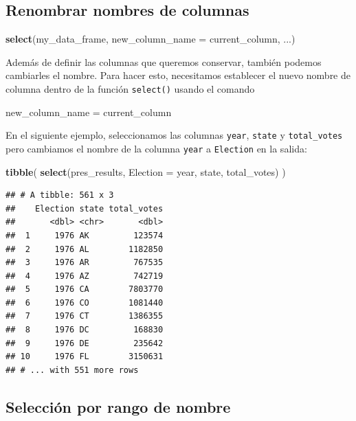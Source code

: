 \documentclass[
]{book}
\newenvironment{Shaded}{\begin{snugshade}}{\end{snugshade}}
\newcommand{\DataTypeTok}[1]{\textcolor[rgb]{0.13,0.29,0.53}{#1}}
\newcommand{\KeywordTok}[1]{\textcolor[rgb]{0.13,0.29,0.53}{\textbf{#1}}}
\newcommand{\NormalTok}[1]{#1}
\newcommand{\StringTok}[1]{\textcolor[rgb]{0.31,0.60,0.02}{#1}}
\begin{document}
\hypertarget{renombrar-nombres-de-columnas}{%
\subsection{Renombrar nombres de columnas}\label{renombrar-nombres-de-columnas}}

\begin{Shaded}
\begin{Highlighting}[]
\KeywordTok{select}\NormalTok{(my_data_frame, }\DataTypeTok{new_column_name =}\NormalTok{ current_column, ...)}
\end{Highlighting}
\end{Shaded}

Además de definir las columnas que queremos conservar, también podemos cambiarles el nombre. Para hacer esto, necesitamos establecer el nuevo nombre de columna dentro de la función \texttt{select()} usando el comando

\begin{Shaded}
\begin{Highlighting}[]
\NormalTok{new_column_name =}\StringTok{ }\NormalTok{current_column}
\end{Highlighting}
\end{Shaded}

En el siguiente ejemplo, seleccionamos las columnas \texttt{year}, \texttt{state} y \texttt{total\_votes} pero cambiamos el nombre de la columna \texttt{year} a \texttt{Election} en la salida:

\begin{Shaded}
\begin{Highlighting}[]
\KeywordTok{tibble}\NormalTok{(}
\KeywordTok{select}\NormalTok{(pres_results, }\DataTypeTok{Election =}\NormalTok{ year, state, total_votes)}
\NormalTok{)}
\end{Highlighting}
\end{Shaded}

\begin{verbatim}
## # A tibble: 561 x 3
##    Election state total_votes
##       <dbl> <chr>       <dbl>
##  1     1976 AK         123574
##  2     1976 AL        1182850
##  3     1976 AR         767535
##  4     1976 AZ         742719
##  5     1976 CA        7803770
##  6     1976 CO        1081440
##  7     1976 CT        1386355
##  8     1976 DC         168830
##  9     1976 DE         235642
## 10     1976 FL        3150631
## # ... with 551 more rows
\end{verbatim}

\hypertarget{selecciuxf3n-por-rango-de-nombre}{%
\subsection{Selección por rango de nombre}\label{selecciuxf3n-por-rango-de-nombre}}
\end{document}

